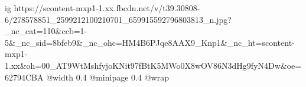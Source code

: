 
 
 
 
 

\ifcmt
  ig https://scontent-mxp1-1.xx.fbcdn.net/v/t39.30808-6/278578851_2599212100210701_659915592796803813_n.jpg?_nc_cat=110&ccb=1-5&_nc_sid=8bfeb9&_nc_ohc=HM4B6PJqe8AAX9_Knp1&_nc_ht=scontent-mxp1-1.xx&oh=00_AT9WtMshfyjoKNit97fBtK5MWo0X8wOV86N3dHg9fyN4Dw&oe=62794CBA
  @width 0.4
  @minipage 0.4
  @wrap \parpic[r]
\fi
